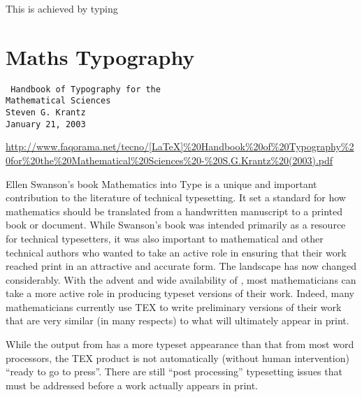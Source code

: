 {{{{This is achieved by typing

\begin{teX}
{\arraycolsep=2pt
 \begin{equation}
 \begin{array}{rcl}
 \frac{1}{2}\Delta(f_{ij}f^{ij}) & = & 2\Bigg({\displaystyle
 \sum_{i<j}}\chi_{ij}(\sigma_{i}-\sigma_{j})^{2}+f^{ij}%
 \nabla_{j}\nabla_{i}(\Delta f)+\\
 & & +\nabla_{k}f_{ij}\nabla^{k}f^{ij}+f^{ij}f^{k}[2
 \nabla_{i}R_{jk}-\nabla_{k}R_{ij}]\Bigg)
 \end{array}
 \end{equation}

\end{teX}



\chapter{Maths Typography}

\texttt{
Handbook of Typography for the\\
Mathematical Sciences\\
Steven G. Krantz\\
January 21, 2003}\par

\url{http://www.faqorama.net/tecno/[LaTeX]%20Handbook%20of%20Typography%20for%20the%20Mathematical%20Sciences%20-%20S.G.Krantz%20(2003).pdf}


Ellen Swanson’s book Mathematics into Type is a unique and important contribution to the literature of technical typesetting. It set a
standard for how mathematics should be translated from a handwritten
manuscript to a printed book or document. While Swanson’s book was
intended primarily as a resource for technical typesetters, it was also important to mathematical and other technical authors who wanted to take
an active role in ensuring that their work reached print in an attractive
and accurate form.
The landscape has now changed considerably. With the advent and
wide availability of \tex,
most mathematicians can take a more active
role in producing typeset versions of their work. Indeed, many mathematicians currently use TEX to write preliminary versions of their work
that are very similar (in many respects) to what will ultimately appear
in print.

While the output from \tex has a more typeset appearance than that
from most word processors, the TEX product is not automatically (without human intervention) \enquote{ready to go to press}. There are still \enquote{post processing} typesetting issues that must be addressed before a work
actually appears in print. 

}}}}
